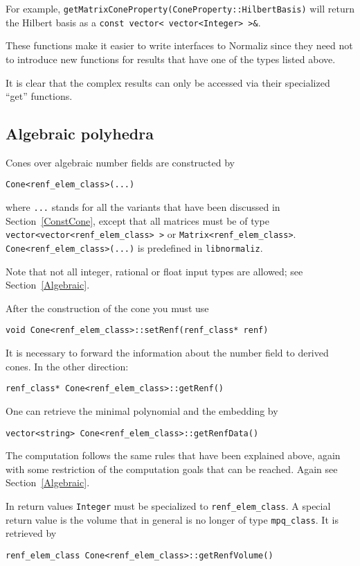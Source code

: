 \documentclass[12pt,a4paper]{scrartcl}
\theoremstyle{definition}
\def\ttt{\texttt}
\begin{document}
\begin{small}
For example, \verb|getMatrixConeProperty(ConeProperty::HilbertBasis)| will return the Hilbert basis as a \verb|const vector< vector<Integer> >&|.

These functions make it easier to write interfaces to Normaliz since they need not to introduce new functions for results that have one of the types listed above.

It is clear that the complex results can only be accessed via their specialized ``get'' functions.

\subsection{Algebraic polyhedra}

Cones over algebraic number fields are constructed by
\begin{Verbatim}
Cone<renf_elem_class>(...)
\end{Verbatim}
where \ttt{...} stands for all the variants that have been discussed in Section~\ref{ConstCone}, except that all matrices must be of type \verb+vector<vector<renf_elem_class> >+ or \verb+Matrix<renf_elem_class>+. \verb|Cone<renf_elem_class>(...)| is predefined in \ttt{libnormaliz}.

Note that not all integer, rational or float input types are allowed; see Section~\ref{Algebraic}.

After the construction of the cone you must use
\begin{Verbatim}
void Cone<renf_elem_class>::setRenf(renf_class* renf)
\end{Verbatim}
It is necessary to forward the information about the number field to derived cones. In the other direction:
\begin{Verbatim}
renf_class* Cone<renf_elem_class>::getRenf()
\end{Verbatim}

One can retrieve the minimal polynomial and the embedding by
\begin{Verbatim}
vector<string> Cone<renf_elem_class>::getRenfData()
\end{Verbatim}

The computation follows the same rules that have been explained above, again with some restriction of the computation goals that can be reached. Again see Section~\ref{Algebraic}.

In return values \ttt{Integer} must be specialized to \verb|renf_elem_class|. A special return value is the volume that in general is no longer of type \verb|mpq_class|. It is retrieved by
\begin{Verbatim}
renf_elem_class Cone<renf_elem_class>::getRenfVolume() 
\end{Verbatim}


\end{small}
\end{document}
